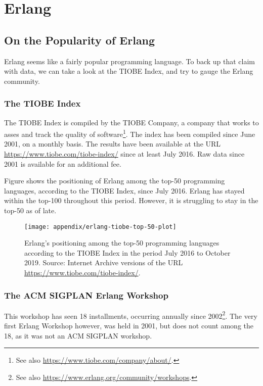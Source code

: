 \chapter{Erlang}
\label{app:erlang}

\section{On the Popularity of Erlang}
\label{app:popularity-of-erlang}

Erlang seems like a fairly popular programming language. To back up
that claim with data, we can take a look at the TIOBE Index, and try
to gauge the Erlang community.

\subsection{The TIOBE Index}

The TIOBE Index is compiled by the TIOBE Company, a company that works
to asses and track the quality of software\footnote{See also
\url{https://www.tiobe.com/company/about/}.}. The index has been
compiled since June 2001, on a monthly basis. The results have been
available at the URL \url{https://www.tiobe.com/tiobe-index/} since at
least July 2016. Raw data since 2001 is available for an additional
fee.

Figure  shows the positioning of
Erlang among the top-50 programming languages, according to the TIOBE
Index, since July 2016. Erlang has stayed within the top-100
throughout this period. However, it is struggling to stay in the
top-50 as of late.

\begin{figure}[h!]
\centering
\texttt{[image: appendix/erlang-tiobe-top-50-plot]}
\caption{Erlang's positioning among the top-50 programming languages
according to the TIOBE Index in the period July 2016 to October 2019.
Source: Internet Archive versions of the URL
\url{https://www.tiobe.com/tiobe-index/}.}
\label{fig:erlang-tiobe-top-50}
\end{figure}

\subsection{The ACM SIGPLAN Erlang Workshop}

This workshop has seen 18 installments, occurring annually since
2002\footnote{See also
\url{https://www.erlang.org/community/workshops}.}. The very first
Erlang Workshop however, was held in 2001, but does not count among
the 18, as it was not an ACM SIGPLAN workshop.

